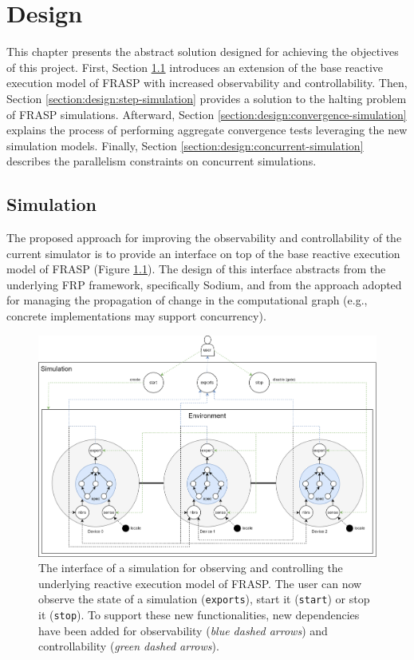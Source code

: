 
\chapter{Design}
\label{chapter:design}

This chapter presents the abstract solution designed for achieving the
objectives of this project. First, Section \ref{section:design:simulation}
introduces an extension of the base reactive execution model of FRASP with
increased observability and controllability. Then, Section
\ref{section:design:step-simulation} provides a solution to the halting problem
of FRASP simulations. Afterward, Section
\ref{section:design:convergence-simulation} explains the process of performing
aggregate convergence tests leveraging the new simulation models. Finally,
Section \ref{section:design:concurrent-simulation} describes the parallelism
constraints on concurrent simulations.

\section{Simulation}
\label{section:design:simulation}

The proposed approach for improving the observability and controllability of
the current simulator is to provide an interface on top of the base reactive
execution model of FRASP (Figure \ref{figure:simulation}). The design of this
interface abstracts from the underlying \ac{FRP} framework, specifically
Sodium, and from the approach adopted for managing the propagation of change in
the computational graph (e.g., concrete implementations may support
concurrency).

\begin{figure}[!ht]
  \centering
  \includegraphics[width=1\textwidth]{resources/figures/simulation.png}
  \caption{
    The interface of a simulation for observing and controlling the
    underlying reactive execution model of FRASP. The user can now observe the
    state of a simulation (\texttt{exports}), start it (\texttt{start}) or stop
    it (\texttt{stop}). To support these new functionalities, new
    dependencies have been added for observability (\textit{blue dashed arrows})
    and controllability (\textit{green dashed arrows}).
  }
  \label{figure:simulation}
\end{figure}

